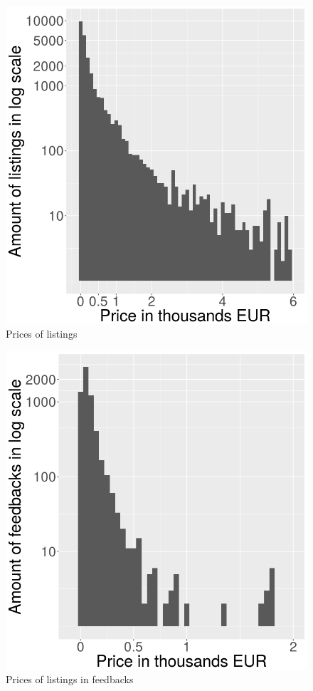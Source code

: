 \documentclass[
  digital, %
  table,   %
  lof,     %
  lot,     %
  oneside
]{fithesis3}
\begin{document}
\begin{figure}[!htb]
    \centering
    \includegraphics[scale=0.4]{listingxprice}
    \caption{Prices of listings}
    \label{listingxprice}
\end{figure}

\begin{figure}[!htb]
    \centering
    \includegraphics[scale=0.4]{flistingxprice}
    \caption{Prices of listings in feedbacks}
    \label{flistingxprice}
\end{figure}
\end{document}
